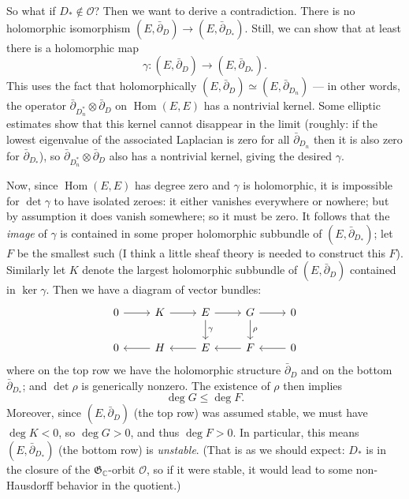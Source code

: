 \documentclass[12pt,letterpaper,reqno]{article}
\numberwithin{equation}{section}
\newcommand{\fG}{{\mathfrak G}}
\newcommand{\cO}{\ensuremath{\mathcal O}}
\newcommand{\C}{\ensuremath{\mathbb C}}
\newcommand{\ti}[1]{\textit{#1}}
\DeclareMathOperator{\Hom}{Hom}
\begin{document}
\begin{pf}
So what if $D_* \not\in \cO$? Then we want to derive
a contradiction. There 
is no holomorphic isomorphism $(E,\bar\partial_D) \to (E,\bar\partial_{D_*})$.
Still, we can show that at least there is a 
holomorphic map
\begin{equation}
  \gamma: (E,\bar\partial_D) \to (E,\bar\partial_{D_*}).
\end{equation}
This uses the fact that holomorphically $(E,\bar\partial_D) \simeq (E,\bar\partial_{D_n})$ --- in other words, the operator
$\bar\partial_{D^*_n} \otimes \bar\partial_D$
on $\Hom(E,E)$ has a nontrivial kernel. Some elliptic estimates
show that this kernel cannot disappear in the limit (roughly:
if the lowest eigenvalue of the associated Laplacian is zero
for all $\bar\partial_{D_n}$ then it is also zero for $\bar\partial_{D_*}$),
so $\bar\partial_{D^*_n} \otimes \bar\partial_D$
 also has a nontrivial kernel,
giving the desired $\gamma$.

Now, since $\Hom(E,E)$ has degree zero and $\gamma$ is holomorphic,
it is impossible for $\det \gamma$ to have isolated zeroes: it either
vanishes everywhere or nowhere; but by assumption it does vanish somewhere;
so it must be zero. It follows that the \ti{image} of $\gamma$ is contained in
some proper holomorphic subbundle of $(E,\bar\partial_{D_*})$; let $F$
be the smallest such (I think a little
sheaf theory is needed to construct this $F$).
Similarly let $K$ denote the largest holomorphic subbundle 
of $(E,\bar\partial_D)$ contained in $\ker \gamma$.
Then we have a diagram of vector bundles:
\begin{equation}
\begin{tikzcd}
0 \arrow[r] & K \arrow[r] & E \arrow[r] \arrow[d,"\gamma"] & G \arrow[d,"\rho"] \arrow[r] & 0 \\
0 & H \arrow[l] & E \arrow[l] & F \arrow[l] & 0 \arrow[l]
\end{tikzcd}  
\end{equation}
where on the top row we have the holomorphic structure
$\bar\partial_D$ and on the bottom $\bar\partial_{D_*}$;
and $\det \rho$ is generically nonzero.
The existence of $\rho$ then implies 
\begin{equation}
  \deg G \le \deg F.
\end{equation}
Moreover, since $(E,\bar\partial_D)$ (the top row) was assumed stable,
we must have $\deg K < 0$, so $\deg G > 0$, and thus $\deg F > 0$.
In particular, this means $(E,\bar\partial_{D_*})$ (the bottom row) is 
\ti{unstable}. (That is as we should expect: $D_*$ is 
in the closure of the $\fG_\C$-orbit $\cO$, so if it
were stable, it would lead to some non-Hausdorff behavior 
in the quotient.)


\end{pf}
\end{document}
